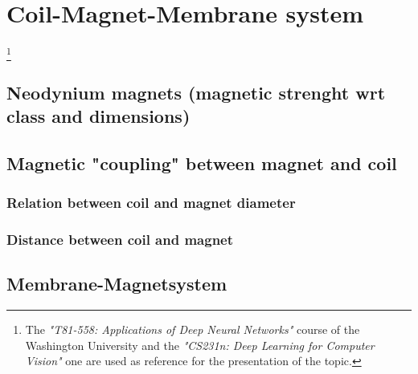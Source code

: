 \section{Coil-Magnet-Membrane system}\footnote{The \textit{"T81-558: Applications of Deep Neural Networks"} course of the Washington University \cite{T81-558} and the \textit{"CS231n: Deep Learning for Computer Vision"}\cite{CS231n} one are used as reference for the presentation of the topic.}

\subsection{Neodynium magnets (magnetic strenght wrt class and dimensions)}

\subsection{Magnetic "coupling" between magnet and coil}

\subsubsection{Relation between coil and magnet diameter}

\subsubsection{Distance between coil and magnet}

\subsection{Membrane-Magnetsystem}